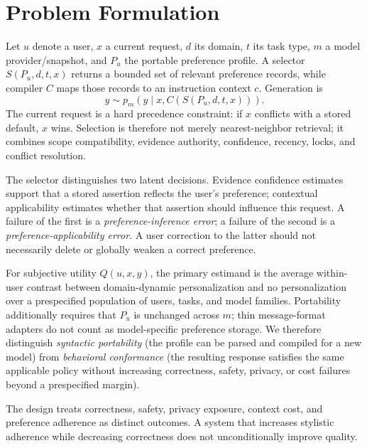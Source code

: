 \section{Problem Formulation}
\label{sec:formulation}

Let $u$ denote a user, $x$ a current request, $d$ its domain, $t$ its task type,
$m$ a model provider/snapshot, and $P_u$ the portable preference profile. A
selector $S(P_u,d,t,x)$ returns a bounded set of relevant preference records,
while compiler $C$ maps those records to an instruction context $c$. Generation
is
\begin{equation}
  y \sim p_m\!\left(y \mid x, C(S(P_u,d,t,x))\right).
\end{equation}
The current request is a hard precedence constraint: if $x$ conflicts with a
stored default, $x$ wins. Selection is therefore not merely nearest-neighbor
retrieval; it combines scope compatibility, evidence authority, confidence,
recency, locks, and conflict resolution.

The selector distinguishes two latent decisions. Evidence confidence estimates
support that a stored assertion reflects the user's preference; contextual
applicability estimates whether that assertion should influence this request. A
failure of the first is a \emph{preference-inference error}; a failure of the
second is a \emph{preference-applicability error}. A user correction to the latter
should not necessarily delete or globally weaken a correct preference.

For subjective utility $Q(u,x,y)$, the primary estimand is the average
within-user contrast between domain-dynamic personalization and no
personalization over a prespecified population of users, tasks, and model
families. Portability additionally requires that $P_u$ is unchanged across $m$;
thin message-format adapters do not count as model-specific preference storage.
We therefore distinguish \emph{syntactic portability} (the profile can be parsed
and compiled for a new model) from \emph{behavioral conformance} (the resulting
response satisfies the same applicable policy without increasing correctness,
safety, privacy, or cost failures beyond a prespecified margin).

The design treats correctness, safety, privacy exposure, context cost, and
preference adherence as distinct outcomes. A system that increases stylistic
adherence while decreasing correctness does not unconditionally improve quality.
